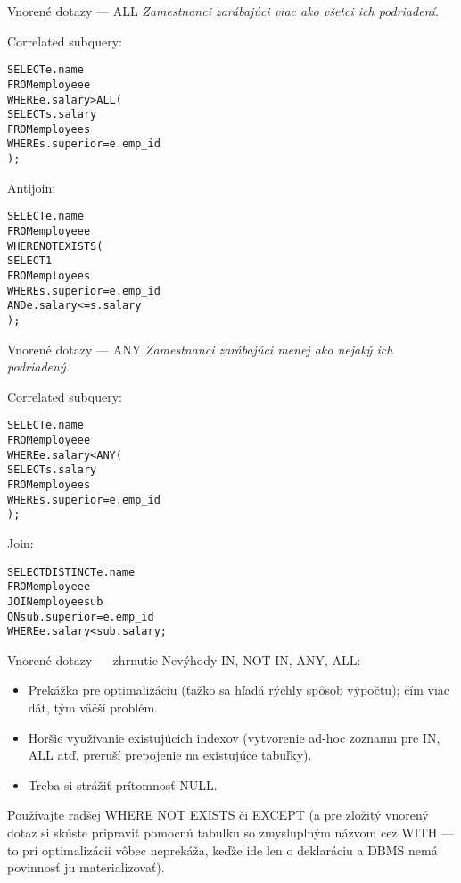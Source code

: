 \documentclass[12pt]{beamer}
\def\blue#1{\textcolor{Cerulean}{#1}}
\begin{document}
\begin{frame}[fragile]{Vnorené dotazy --- ALL}
\footnotesize
\emph{Zamestnanci zarábajúci viac ako všetci ich podriadení.}\\[7mm]
\begin{minipage}{.4\pdfpagewidth}
Correlated subquery:
\footnotesize
\begin{alltt}
SELECT e.name
FROM employee e
WHERE e.salary > \blue{ALL} (
  SELECT s.salary
  FROM employee s
  WHERE s.superior = e.emp_id
);

\end{alltt}
\end{minipage}
\hfill\vline\hfill
\begin{minipage}{.4\pdfpagewidth}
Antijoin:
\footnotesize
\begin{alltt}
SELECT e.name
FROM employee e
WHERE NOT EXISTS (
  SELECT 1
  FROM employee s
  WHERE s.superior = e.emp_id
  AND e.salary <= s.salary
);
\end{alltt}
\end{minipage}
\end{frame}

\begin{frame}[fragile]{Vnorené dotazy --- ANY}
\footnotesize
\emph{Zamestnanci zarábajúci menej ako nejaký ich podriadený.}\\[7mm]
\begin{minipage}{.4\pdfpagewidth}
Correlated subquery:
\footnotesize
\begin{alltt}
SELECT e.name
FROM employee e
WHERE e.salary < \blue{ANY} (
  SELECT s.salary
  FROM employee s
  WHERE s.superior = e.emp_id
);
\end{alltt}
\end{minipage}
\hfill\vline\hfill
\begin{minipage}{.4\pdfpagewidth}
Join:
\footnotesize
\begin{alltt}
SELECT DISTINCT e.name
FROM employee e
  JOIN employee sub
    ON sub.superior = e.emp_id
WHERE e.salary < sub.salary;


\end{alltt}
\end{minipage}
\end{frame}

\begin{frame}{Vnorené dotazy --- zhrnutie}
Nevýhody IN, NOT IN, ANY, ALL:
\begin{itemize}
\item Prekážka pre optimalizáciu (ťažko sa hľadá rýchly spôsob výpočtu); čím viac dát, tým väčší problém.
\item Horšie využívanie existujúcich indexov (vytvorenie ad-hoc zoznamu pre IN, ALL atď. preruší prepojenie na existujúce tabuľky).
\item Treba si strážiť prítomnosť NULL.
\end{itemize}
\bigskip

Používajte radšej WHERE NOT EXISTS či EXCEPT
(a pre zložitý vnorený dotaz si skúste pripraviť pomocnú tabuľku so zmysluplným názvom cez WITH ---
to pri optimalizácii vôbec neprekáža, keďže ide len o deklaráciu a DBMS nemá povinnosť ju materializovať).
\end{frame}
\end{document}
